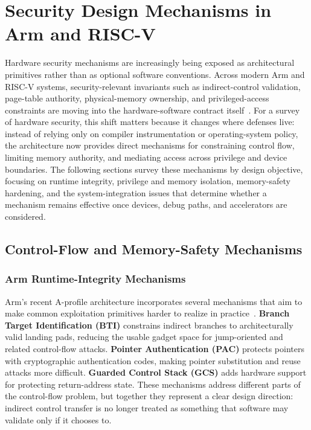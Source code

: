 \section{Security Design Mechanisms in Arm and RISC-V}

Hardware security mechanisms are increasingly being exposed as architectural primitives rather than as optional software conventions. Across modern Arm and RISC-V systems, security-relevant invariants such as indirect-control validation, page-table authority, physical-memory ownership, and privileged-access constraints are moving into the hardware-software contract itself~\cite{armv-a,riscv_privileged}. For a survey of hardware security, this shift matters because it changes where defenses live: instead of relying only on compiler instrumentation or operating-system policy, the architecture now provides direct mechanisms for constraining control flow, limiting memory authority, and mediating access across privilege and device boundaries. The following sections survey these mechanisms by design objective, focusing on runtime integrity, privilege and memory isolation, memory-safety hardening, and the system-integration issues that determine whether a mechanism remains effective once devices, debug paths, and accelerators are considered.

\subsection{Control-Flow and Memory-Safety Mechanisms}

\subsubsection{Arm Runtime-Integrity Mechanisms}

Arm's recent A-profile architecture incorporates several mechanisms that aim to make common exploitation primitives harder to realize in practice~\cite{armv-a}. \textbf{Branch Target Identification (BTI)} constrains indirect branches to architecturally valid landing pads, reducing the usable gadget space for jump-oriented and related control-flow attacks. \textbf{Pointer Authentication (PAC)} protects pointers with cryptographic authentication codes, making pointer substitution and reuse attacks more difficult. \textbf{Guarded Control Stack (GCS)} adds hardware support for protecting return-address state. These mechanisms address different parts of the control-flow problem, but together they represent a clear design direction: indirect control transfer is no longer treated as something that software may validate only if it chooses to.

